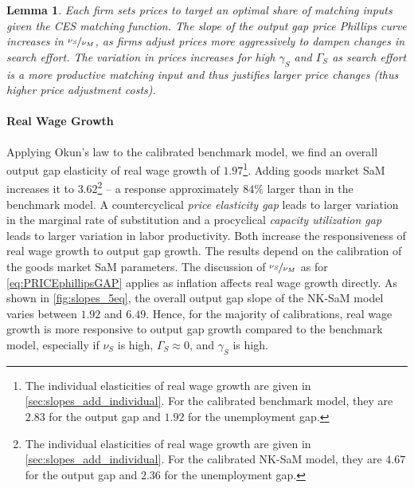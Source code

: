 \documentclass[12pt,3p,authoryear,review]{elsarticle}
\newtheorem{lemma}{Lemma}
\begin{document}
\begin{lemma}%
	Each firm sets prices to target an optimal share of matching inputs given the CES matching function. The slope of the output gap price Phillips curve increases in $\nicefrac{\nu_S}{\nu_M}$, as firms adjust prices more aggressively to dampen changes in search effort. The variation in prices increases for high $\gamma_S$ and $\Gamma_S$ as search effort is a more productive matching input and thus justifies larger price changes (thus higher price adjustment costs).%
\end{lemma}%
\paragraph{Real Wage Growth}%
Applying Okun's law to the calibrated benchmark model, we find an overall output gap elasticity of real wage growth of $1.97$\footnote{The individual elasticities of real wage growth are given in \ref{sec:slopes_add_individual}. For the calibrated benchmark model, they are $2.83$ for the output gap and $1.92$ for the unemployment gap.}. Adding goods market SaM increases it to $3.62$\footnote{The individual elasticities of real wage growth are given in \ref{sec:slopes_add_individual}. For the calibrated NK-SaM model, they are $4.67$ for the output gap and $2.36$ for the unemployment gap.} -- a response approximately $84\%$ larger than in the benchmark model. A countercyclical \emph{price elasticity gap} leads to larger variation in the marginal rate of substitution and a procyclical \emph{capacity utilization gap} leads to larger variation in labor productivity. Both increase the responsiveness of real wage growth to output gap growth. The results depend on the calibration of the goods market SaM parameters. The discussion of $\nicefrac{\nu_S}{\nu_M}$ as for \eqref{eq:PRICEphillipsGAP} applies as inflation affects real wage growth directly. As shown in \cref{fig:slopes_5eq}, the overall output gap slope of the NK-SaM model varies between $1.92$ and $6.49$. Hence, for the majority of calibrations, real wage growth is more responsive to output gap growth compared to the benchmark model, especially if $\nu_S$ is high, $\Gamma_S \approx 0$, and $\gamma_S$ is high.%
\end{document}
